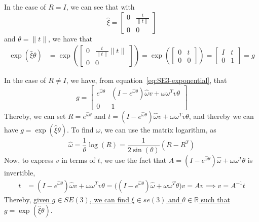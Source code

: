 In the case of \( R = I \), we can see that with
\begin{equation*}
      \hat \xi =
      \begin{bmatrix}
            0 & \frac{t}{\lVert t \rVert} \\
            0 & 0
      \end{bmatrix}
\end{equation*}
and \( \theta = \lVert t \rVert \), we have that
\begin{align*}
      \exp(\hat{\xi} \theta)
       & =
      \exp\left(
      \begin{bmatrix}
                  0 & \frac{t}{\lVert t \rVert} \lVert t \rVert \\
                  0 & 0
            \end{bmatrix}
      \right)
      =
      \exp\left(
      \begin{bmatrix}
                  0 & t \\
                  0 & 0
            \end{bmatrix}
      \right)
      =
      \begin{bmatrix}
            I & t \\
            0 & 1
      \end{bmatrix}
      =
      g
\end{align*}

In the case of \( R \neq I \), we have, from equation~\eqref{eq:SE3-exponential}, that
\begin{equation*}
      g
      =
      \begin{bmatrix}
            e^{\hat \omega \theta}
              &
            (I - e^{\hat \omega \theta}) \hat \omega v + \omega \omega^T v \theta
            \\
            0 & 1
      \end{bmatrix}
\end{equation*}
Thereby, we can set \( R = e^{\hat \omega \theta} \) and \( t = (I - e^{\hat \omega \theta}) \hat \omega v + \omega \omega^T v \theta \), and thereby we can have \( g = \exp(\hat{\xi} \theta) \).
To find \( \omega \), we can use the matrix logarithm, as
\begin{equation*}
      \hat\omega = \frac{1}{\theta} \log(R) = \frac{1}{2 \sin(\theta)} \left( R - R^T \right)
\end{equation*}
Now, to express \( v \) in terms of \( t \), we use the fact that \( A = \left(I-e^{\hat{\omega} \theta}\right) \hat{\omega}+\omega \omega^{T} \theta \) is invertible,
\begin{align*}
      t
       & =
      (I - e^{\hat \omega \theta}) \hat \omega v + \omega \omega^T v \theta
      =
      \Big( (I - e^{\hat \omega \theta}) \hat \omega + \omega \omega^T \theta \Big) v
      =
      A v
      \implies
      v
      =
      A^{-1} t
\end{align*}
Thereby, \underline{given \( g \in SE(3) \), we can find \( \xi \in se(3) \) and \( \theta \in \mathbb{R} \) such that \( g = \exp(\hat{\xi} \theta) \)}.

